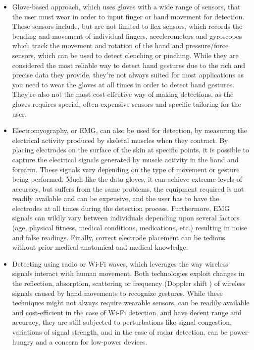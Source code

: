 \documentclass[12pt]{article}
\begin{document}
\begin{itemize}
  \item Glove-based approach, which uses gloves with a wide range of sensors, that the user must wear in order to input finger or hand movement for detection. These sensors include, but are not limited to flex sensors, which records the bending and movement of individual fingers, accelerometers and gyroscopes which track the movement and rotation of the hand and pressure/force sensors, which can be used to detect clenching or pinching. While they are considered the most reliable way to detect hand gestures due to the rich and precise data they provide, they're not always suited for most applications as you need to wear the gloves at all times in order to detect hand gestures. They're also not the most cost-effective way of making detections, as the gloves requires special, often expensive sensors and specific tailoring for the user.
  \item Electromyography, or EMG, can also be used for detection, by measuring the electrical activity produced by skeletal muscles when they contract. By placing electrodes on the surface of the skin at specific points, it is possible to capture the electrical signals generated by muscle activity in the hand and forearm. These signals vary depending on the type of movement or gesture being performed. Much like the data gloves, it can achieve extreme levels of accuracy, but suffers from the same problems, the equipment required is not readily available and can be expensive, and the user has to have the electrodes at all times during the detection process. Furthermore, EMG signals can wildly vary between individuals depending upon several factors (age, physical fitness, medical conditions, medications, etc.) resulting in noise and false readings. Finally, correct electrode placement can be tedious without prior medical anatomical and medical knowledge.
  \item Detecting using radio or Wi-Fi waves, which leverages the way wireless signals interact with human movement. Both technologies exploit changes in the reflection, absorption, scattering or frequency (Doppler shift \cite{kim2016hand}) of wireless signals caused by hand movements to recognize gestures. While these techniques might not always require wearable sensors, can be readily available and cost-efficient in the case of Wi-Fi detection, and have decent range and accuracy, they are still subjected to perturbations like signal congestion, variations of signal strength, and in the case of radar detection, can be power-hungry and a concern for low-power devices.
\end{itemize}
\end{document}
